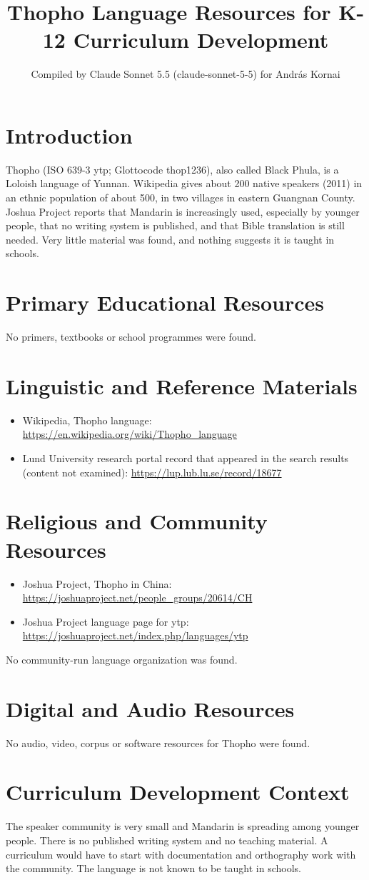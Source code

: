 \documentclass[12pt]{article}
\title{Thopho Language Resources for K-12 Curriculum Development}
\author{Compiled by Claude Sonnet 5.5 (claude-sonnet-5-5) for Andr\'as Kornai}
\date{}
\begin{document}
\maketitle

\section{Introduction}
Thopho (ISO 639-3 ytp; Glottocode thop1236), also called Black Phula, is a Loloish language of Yunnan. Wikipedia gives about 200 native speakers (2011) in an ethnic population of about 500, in two villages in eastern Guangnan County. Joshua Project reports that Mandarin is increasingly used, especially by younger people, that no writing system is published, and that Bible translation is still needed. Very little material was found, and nothing suggests it is taught in schools.

\section{Primary Educational Resources}
No primers, textbooks or school programmes were found.

\section{Linguistic and Reference Materials}
\begin{itemize}
\item Wikipedia, Thopho language: \url{https://en.wikipedia.org/wiki/Thopho_language}
\item Lund University research portal record that appeared in the search results (content not examined): \url{https://lup.lub.lu.se/record/18677}
\end{itemize}

\section{Religious and Community Resources}
\begin{itemize}
\item Joshua Project, Thopho in China: \url{https://joshuaproject.net/people_groups/20614/CH}
\item Joshua Project language page for ytp: \url{https://joshuaproject.net/index.php/languages/ytp}
\end{itemize}
No community-run language organization was found.

\section{Digital and Audio Resources}
No audio, video, corpus or software resources for Thopho were found.

\section{Curriculum Development Context}
The speaker community is very small and Mandarin is spreading among younger people. There is no published writing system and no teaching material. A curriculum would have to start with documentation and orthography work with the community. The language is not known to be taught in schools.
\end{document}
